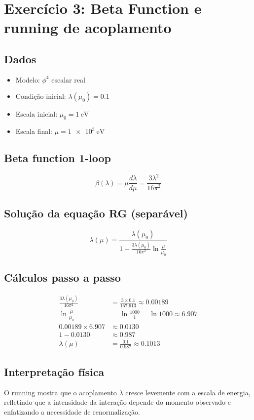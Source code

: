 \documentclass[12pt,a4paper]{article}
\begin{document}
\newpage
\section*{Exercício 3: Beta Function e running de acoplamento}

\subsection*{Dados}
\begin{itemize}
    \item Modelo: $\phi^4$ escalar real
    \item Condição inicial: $\lambda(\mu_0) = 0.1$
    \item Escala inicial: $\mu_0 = \SI{1}{\electronvolt}$
    \item Escala final: $\mu = \SI{1e3}{\electronvolt}$
\end{itemize}

\subsection*{Beta function 1-loop}
\[
\beta(\lambda) = \mu \frac{d\lambda}{d\mu} = \frac{3 \lambda^2}{16\pi^2}
\]

\subsection*{Solução da equação RG (separável)}
\[
\lambda(\mu) = \frac{\lambda(\mu_0)}{1 - \frac{3 \lambda(\mu_0)}{16\pi^2} \ln \frac{\mu}{\mu_0}}
\]

\subsection*{Cálculos passo a passo}
\begin{align*}
\frac{3\lambda(\mu_0)}{16\pi^2} &= \frac{3 \times 0.1}{157.913} \approx 0.00189 \\
\ln \frac{\mu}{\mu_0} &= \ln \frac{1000}{1} = \ln 1000 \approx 6.907 \\
0.00189 \times 6.907 &\approx 0.0130 \\
1 - 0.0130 &\approx 0.987 \\
\lambda(\mu) &= \frac{0.1}{0.987} \approx 0.1013
\end{align*}

\subsection*{Interpretação física}
O running mostra que o acoplamento $\lambda$ cresce levemente com a escala de energia, refletindo que a intensidade da interação depende do momento observado e enfatizando a necessidade de renormalização.
\end{document}
